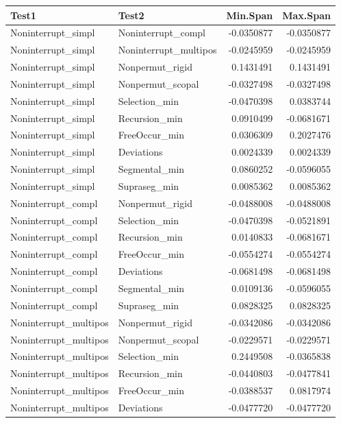 \documentclass[
]{article}
\begin{document}
\begin{longtable}[]{@{}llrr@{}}
\toprule\noalign{}
Test1 & Test2 & Min.Span & Max.Span \\
\midrule\noalign{}
\endhead
\bottomrule\noalign{}
\endlastfoot
Noninterrupt\_simpl & Noninterrupt\_compl & -0.0350877 & -0.0350877 \\
Noninterrupt\_simpl & Noninterrupt\_multipos & -0.0245959 &
-0.0245959 \\
Noninterrupt\_simpl & Nonpermut\_rigid & 0.1431491 & 0.1431491 \\
Noninterrupt\_simpl & Nonpermut\_scopal & -0.0327498 & -0.0327498 \\
Noninterrupt\_simpl & Selection\_min & -0.0470398 & 0.0383744 \\
Noninterrupt\_simpl & Recursion\_min & 0.0910499 & -0.0681671 \\
Noninterrupt\_simpl & FreeOccur\_min & 0.0306309 & 0.2027476 \\
Noninterrupt\_simpl & Deviations & 0.0024339 & 0.0024339 \\
Noninterrupt\_simpl & Segmental\_min & 0.0860252 & -0.0596055 \\
Noninterrupt\_simpl & Supraseg\_min & 0.0085362 & 0.0085362 \\
Noninterrupt\_compl & Nonpermut\_rigid & -0.0488008 & -0.0488008 \\
Noninterrupt\_compl & Selection\_min & -0.0470398 & -0.0521891 \\
Noninterrupt\_compl & Recursion\_min & 0.0140833 & -0.0681671 \\
Noninterrupt\_compl & FreeOccur\_min & -0.0554274 & -0.0554274 \\
Noninterrupt\_compl & Deviations & -0.0681498 & -0.0681498 \\
Noninterrupt\_compl & Segmental\_min & 0.0109136 & -0.0596055 \\
Noninterrupt\_compl & Supraseg\_min & 0.0828325 & 0.0828325 \\
Noninterrupt\_multipos & Nonpermut\_rigid & -0.0342086 & -0.0342086 \\
Noninterrupt\_multipos & Nonpermut\_scopal & -0.0229571 & -0.0229571 \\
Noninterrupt\_multipos & Selection\_min & 0.2449508 & -0.0365838 \\
Noninterrupt\_multipos & Recursion\_min & -0.0440803 & -0.0477841 \\
Noninterrupt\_multipos & FreeOccur\_min & -0.0388537 & 0.0817974 \\
Noninterrupt\_multipos & Deviations & -0.0477720 & -0.0477720 \\

\end{longtable}
\end{document}
